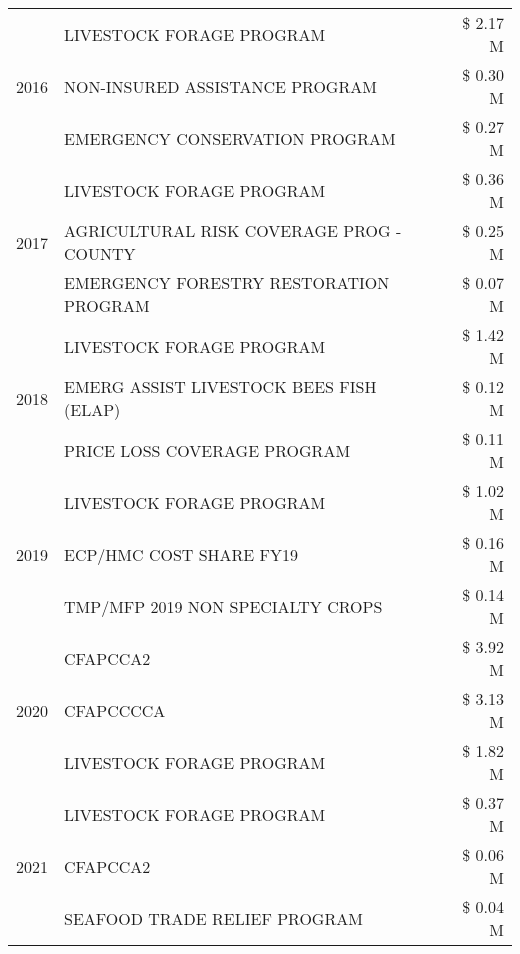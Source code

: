 \begin{tabular}{llr}
\cline{1-3}
\multirow[t]{3}{*}{2016} & LIVESTOCK FORAGE PROGRAM & \$ 2.17 M \\
 & NON-INSURED ASSISTANCE PROGRAM & \$ 0.30 M \\
 & EMERGENCY CONSERVATION PROGRAM & \$ 0.27 M \\
\cline{1-3}
\multirow[t]{3}{*}{2017} & LIVESTOCK FORAGE PROGRAM & \$ 0.36 M \\
 & AGRICULTURAL RISK COVERAGE PROG - COUNTY & \$ 0.25 M \\
 & EMERGENCY FORESTRY RESTORATION PROGRAM & \$ 0.07 M \\
\cline{1-3}
\multirow[t]{3}{*}{2018} & LIVESTOCK FORAGE PROGRAM & \$ 1.42 M \\
 & EMERG ASSIST LIVESTOCK BEES FISH (ELAP) & \$ 0.12 M \\
 & PRICE LOSS COVERAGE PROGRAM & \$ 0.11 M \\
\cline{1-3}
\multirow[t]{3}{*}{2019} & LIVESTOCK FORAGE PROGRAM & \$ 1.02 M \\
 & ECP/HMC COST SHARE FY19 & \$ 0.16 M \\
 & TMP/MFP 2019 NON SPECIALTY CROPS & \$ 0.14 M \\
\cline{1-3}
\multirow[t]{3}{*}{2020} & CFAPCCA2 & \$ 3.92 M \\
 & CFAPCCCCA & \$ 3.13 M \\
 & LIVESTOCK FORAGE PROGRAM & \$ 1.82 M \\
\cline{1-3}
\multirow[t]{3}{*}{2021} & LIVESTOCK FORAGE PROGRAM & \$ 0.37 M \\
 & CFAPCCA2 & \$ 0.06 M \\
 & SEAFOOD TRADE RELIEF PROGRAM & \$ 0.04 M \\
\cline{1-3}
\bottomrule
\end{tabular}
